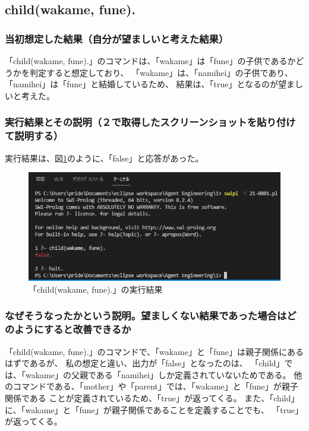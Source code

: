 \subsection{child(wakame, fune).}
\subsubsection{当初想定した結果（自分が望ましいと考えた結果）}
「child(wakame, fune).」のコマンドは、「wakame」は「fune」の子供であるかどうかを判定すると想定しており、
「wakame」は、「namihei」の子供であり、「namihei」は「fune」と結婚しているため、
結果は、「true」となるのが望ましいと考えた。

\subsubsection{実行結果とその説明（２で取得したスクリーンショットを貼り付けて説明する）}
実行結果は、図\ref{graph:4}のように、「false」と応答があった。
\begin{figure}[hbtp]
  \centering
  \caption{「child(wakame, fune).」の実行結果}
  \label{graph:4}
  \includegraphics[scale = 1]{21-0801-04.png}
\end{figure}

\subsubsection{なぜそうなったかという説明。望ましくない結果であった場合はどのようにすると改善できるか}
「child(wakame, fune).」のコマンドで、「wakame」と「fune」は親子関係にあるはずであるが、
私の想定と違い、出力が「false」となったのは、
「child」では、「wakame」の父親である「namihei」しか定義されていないためである。
他のコマンドである、「mother」や「parent」では、「wakame」と「fune」が親子関係である
ことが定義されているため、「true」が返ってくる。
また、「child」に、「wakame」と「fune」が親子関係であることを定義することでも、
「true」が返ってくる。